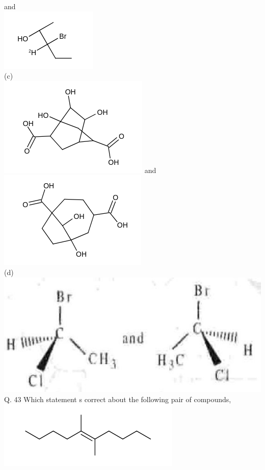 \documentclass[10pt]{article}
\begin{document}
and\\
\includegraphics{smile-931778323880e11aed2814ab53f69ddc2999eb0e}\\
(c)\\
\includegraphics{smile-d26ab81ac368470a8373b06ba0f73b0eefa2d8cd} and\\
\includegraphics{smile-bde0242c4051c30729ca0ff2aeb2e26b5242f776}\\
(d)\\
\includegraphics[max width=\textwidth, center]{2025_01_28_8470952b98110cec3aabg-151}\\
Q. 43 Which statement s correct about the following pair of compounds,\\
\includegraphics{smile-08a2625bf34565b7474ae5ca54fe08c170a1c0e3}\\
\end{document}

